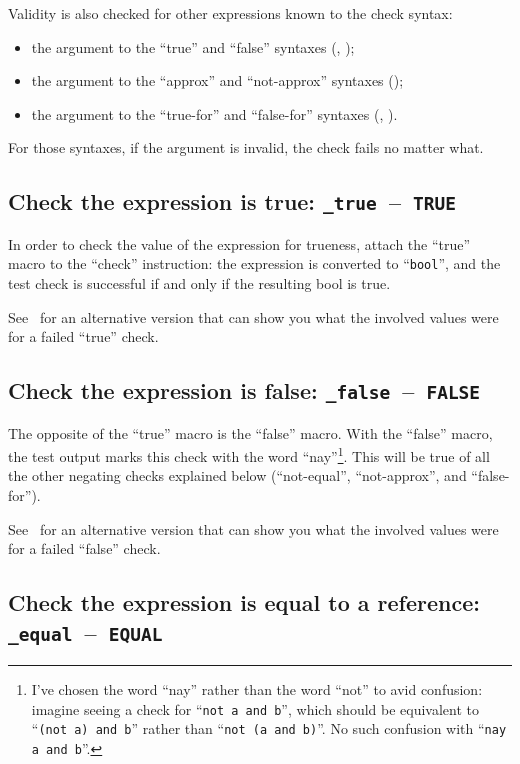 \documentclass[twoside, a4paper, article]{memoir}
\newcommand*\testudocolor{\color{red!80!blue}}
\newcommand*\testudo[1]{\texttt{\testudocolor{}#1}}
\newcommand*\testudopair[2]{\testudo{#1}~--~\testudo{#2}}
\newcommand\subsectiontestudopair[3]{%
  \subsection[#1]{#1: \testudopair{#2}{#3}}}
\providecommand\typesetexample[1]{%
}
\begin{document}
Validity is also checked for other expressions known to the check syntax:
\begin{itemize}
\item the argument to the ``true'' and ``false'' syntaxes
  (, );
\item the argument to the ``approx'' and ``not-approx'' syntaxes
  ();
\item the argument to the ``true-for'' and ``false-for'' syntaxes
  (,
  ).
\end{itemize}
For those syntaxes, if the argument is invalid, the check fails no matter what.

\subsectiontestudopair{Check the expression is true}{\_true}{TRUE}
\label{sec:check-expression-true}

In order to check the value of the expression for trueness, attach the ``true''
macro to the ``check'' instruction: the expression is converted to
``\texttt{bool}'', and the test check is successful if and only if the
resulting bool is true.

\typesetexample{check-true}

See~ for an alternative version that can
show you what the involved values were for a failed ``true'' check.

\subsectiontestudopair{Check the expression is false}{\_false}{FALSE}
\label{sec:check-expression-false}

The opposite of the ``true'' macro is the ``false'' macro.  With the ``false''
macro, the test output marks this check with the word ``nay''\footnote{I've
  chosen the word ``nay'' rather than the word ``not'' to avid confusion:
  imagine seeing a check for ``\texttt{not a and b}'', which should be
  equivalent to ``\texttt{(not a) and b}'' rather than ``\texttt{not (a and
    b)}''.  No such confusion with ``\texttt{nay a and b}''.}.  This will be
true of all the other negating checks explained below (``not-equal'',
``not-approx'', and ``false-for'').

\typesetexample{check-false}

See~ for an alternative version that can
show you what the involved values were for a failed ``false'' check.

\subsectiontestudopair{Check the expression is equal to a reference}%
  {\_equal}{EQUAL}
\label{sec:check-expression-equal-reference}
\end{document}
